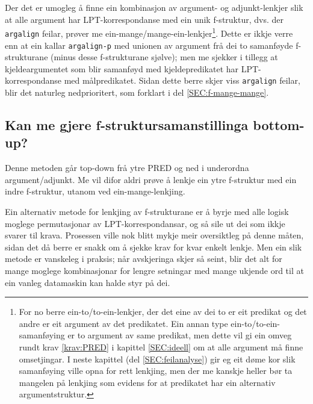 \documentclass[12pt,a4paper,oneside,draft]{report}
\begin{document}
Der det er umogleg å finne ein kombinasjon av argument- og
 adjunkt-lenkjer slik at alle argument har LPT-korrespondanse med ein
 unik f-struktur, dvs. der \texttt{argalign} feilar, prøver me
 ein-mange/mange-ein-lenkjer\footnote{For no berre ein-to/to-ein-lenkjer, der det eine av dei to er
        eit predikat og det andre er eit argument av det
        predikatet. Ein annan type ein-to/to-ein-samanføying er to
        argument av same predikat, men dette vil gi ein omveg rundt
        krav \ref{krav:PRED} i kapittel \ref{SEC:ideell} om at alle
        argument må finne omsetjingar. I neste kapittel (del
        \ref{SEC:feilanalyse}) gir eg eit døme kor slik samanføying
        ville opna for rett lenkjing, men der me kanskje heller bør ta
        mangelen på lenkjing som evidens for at predikatet har ein
        alternativ argumentstruktur. }. Dette er ikkje verre enn at ein
 kallar \texttt{argalign-p} med unionen av argument frå dei to samanføyde
 f-strukturane (minus desse f-strukturane sjølve); men me sjekker i
 tillegg at kjeldeargumentet som blir samanføyd med kjeldepredikatet
 har LPT-korrespondanse med målpredikatet. Sidan dette berre skjer
 viss \texttt{argalign} feilar, blir det naturleg nedprioritert, som forklart
 i del \ref{SEC:f-mange-mange}.

\subsection{Kan me gjere f-struktursamanstillinga bottom-up?}
\label{sec-4.1.3}


Denne metoden går top-down frå ytre PRED og ned i underordna
 argument/adjunkt. Me vil difor aldri prøve å lenkje ein ytre
 f-struktur med ein indre f-struktur, utanom ved ein-mange-lenkjing.

Ein alternativ metode for lenkjing av f-strukturane er å byrje med
 alle logisk moglege permutasjonar av LPT-korrespondansar, og så sile
 ut dei som ikkje svarer til krava. Prosessen ville nok blitt mykje
 meir oversiktleg på denne måten, sidan det då berre er snakk om å
 sjekke krav for kvar enkelt lenkje.  Men ein slik metode er vanskeleg
 i praksis; når avskjeringa skjer så seint, blir det alt for mange
 moglege kombinasjonar for lengre setningar med mange ukjende ord til
 at ein vanleg datamaskin kan halde styr på dei.
\end{document}

